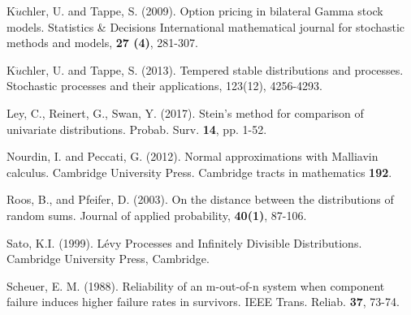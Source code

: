 \documentclass[12pt, a4paper,reqno]{amsart}
\theoremstyle{definition}
\theoremstyle{myremark}
\numberwithin{equation}{section}
\begin{document}
\begin{thebibliography}{}
	K$\ddot{u}$chler, U. and Tappe, S. (2009). Option pricing in bilateral Gamma stock models. Statistics \& Decisions International mathematical journal for stochastic methods and models, {\bf 27 (4)},	281-307.
	
	K$\ddot{u}$chler, U. and Tappe, S. (2013). Tempered stable distributions and processes. Stochastic processes and their applications, 123(12), 4256-4293.
	
	

		Ley, C., Reinert, G., Swan, Y. (2017). Stein's method for comparison of univariate distributions. Probab. Surv. \textbf{14}, pp. 1-52. 	
	
	 Nourdin, I. and Peccati, G. (2012). Normal approximations with Malliavin calculus. Cambridge University Press. Cambridge tracts in mathematics \textbf{192}.
	
	Roos, B., and Pfeifer, D. (2003). On the distance between the distributions of random sums. Journal of applied probability, \textbf{40(1)}, 87-106.
	
	
	
	
	
	 Sato, K.I. (1999). L\'evy Processes and Infinitely Divisible Distributions. Cambridge University Press, Cambridge.
	
	 Scheuer, E. M. (1988). Reliability of an m-out-of-n system when component failure induces higher failure rates in
survivors. IEEE Trans. Reliab. {\bf 37}, 73-74.

	

\end{thebibliography}
\end{document}
